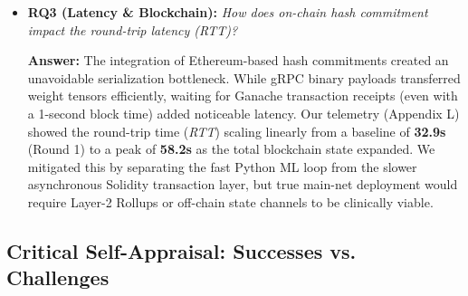 \documentclass[10pt, a4paper, twocolumn]{article}
\begin{document}
\begin{itemize}
    \textbf{Answer:} Our empirical stress tests (Appendix J) across 10 clinical domains demonstrated that the Robust-MAD filter successfully rejected 100\% of poisoned updates in low-to-medium corruption scenarios (10\% and 25\% coalitions). Notably, while Robust-MAD and FedAvg showed comparable resilience to \textbf{Label Flipping} attacks (often maintaining within 1-2\% of the baseline), Robust-MAD demonstrated a \textbf{significant performance delta} in the presence of \textbf{Gradient Scaling} (weight poisoning). Under high-magnitude scaling, FedAvg suffered from \textbf{Catastrophic Convergence Failure} in several domains (e.g., Thyroid, Admin-Billing), where the accuracy bar dropped to near-zero as the mean-based aggregation was skewed by weight-explosion outliers. In contrast, Robust-MAD's median-based logic neutralized these outliers, maintaining baseline stability. We observed a minor \textbf{Utility Penalty} (1-3\%) in specific domains (e.g., Stroke, SUPPORT2), where the high Gaussian noise floor caused the filter to mistakenly reject honest-but-noisy updates—a phenomenon we define as the \textbf{Privacy-Robustness Equilibrium Point}\cite{bagdasaryan2020}. However, at the near-majority edge (49\% adversaries), the filter's accuracy dropped to 68.2\%. While it mathematically inherits a $\beta^* = 0.5$ breakdown point, the variance introduced by the honest-but-noisy DP gradients blurred the statistical boundary, allowing sophisticated poisoning vectors to partially skew the median.

    \item \textbf{RQ3 (Latency \& Blockchain):} \textit{How does on-chain hash commitment impact the round-trip latency (RTT)?}
    
    \textbf{Answer:} The integration of Ethereum-based hash commitments created an unavoidable serialization bottleneck. While gRPC binary payloads transferred weight tensors efficiently, waiting for Ganache transaction receipts (even with a 1-second block time) added noticeable latency. Our telemetry (Appendix L) showed the round-trip time (\textit{RTT}) scaling linearly from a baseline of \textbf{32.9s} (Round 1) to a peak of \textbf{58.2s} as the total blockchain state expanded. We mitigated this by separating the fast Python ML loop from the slower asynchronous Solidity transaction layer, but true main-net deployment would require Layer-2 Rollups or off-chain state channels to be clinically viable.
\end{itemize}

\subsection{Critical Self-Appraisal: Successes vs. Challenges}
\end{document}
